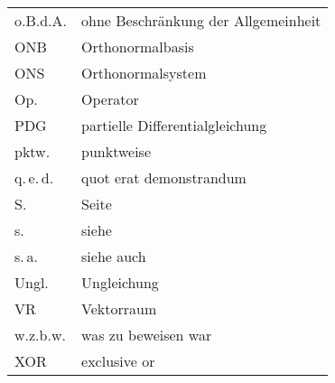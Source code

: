 \begin{tabular}{ll}
o.B.d.A. & ohne Beschränkung der Allgemeinheit\\
ONB & Orthonormalbasis\\
ONS & Orthonormalsystem\\
Op. & Operator\\
PDG & partielle Differentialgleichung\\
pktw. & punktweise\\
q.\,e.\,d. & quot erat demonstrandum\\
S. & Seite\\
s. & siehe\\
s.\,a. & siehe auch\\
Ungl. & Ungleichung\\
VR & Vektorraum\\
w.z.b.w. & was zu beweisen war\\
XOR & exclusive or
\end{tabular}

\newpage\vglue 10pt
